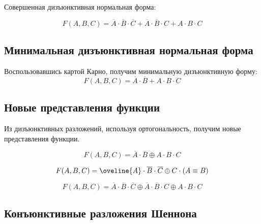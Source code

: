 \documentclass[a4paper,10pt]{article} %
\begin{document}
	Совершенная дизъюнктивная нормальная форма: 
	
	\begin{equation}
		F(A, B, C) = \overline{A} \cdot \overline{B} \cdot \overline{C} +
		\overline{A} \cdot \overline{B} \cdot C + 
		A \cdot B \cdot C 
	\end{equation}
	
	\subsection{Минимальная дизъюнктивная нормальная форма}
	
	Воспользовавшись картой Карно, получим минимальную дизъюнктивную форму:
	\begin{equation}
		F(A, B, C) = \overline{A} \cdot \overline{B} + A \cdot B \cdot C 
	\end{equation}

	\subsection{Новые представления функции}
	
	Из дизъюнктивных разложений, используя ортогональность, получим новые представления функции.
	
	\begin{equation}
		F(A, B, C) = \overline{A} \cdot \overline{B} \oplus A \cdot B \cdot C
	\end{equation}
	
	\begin{equation}
		F(A, B, C) = \oveline{A} \cdot \overline{B} \cdot \overline{C} 
		\oplus C \cdot (A \equiv B) 
	\end{equation}
	
	\begin{equation}
		F(A, B, C) = \overline{A} \cdot \overline{B} \cdot \overline{C} \oplus
		\overline{A} \cdot \overline{B} \cdot C \oplus
		A \cdot B \cdot C 
	\end{equation}
	
	\subsection{Конъюнктивные разложения Шеннона}
	
\end{document}
